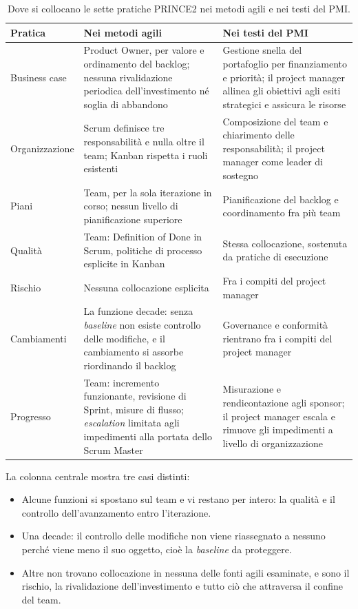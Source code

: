 \begin{table}[!htb]
\centering
\small
\caption{Dove si collocano le sette pratiche PRINCE2 nei metodi agili e nei
testi del PMI.}
\label{tab:ridistribuzione}
\begin{tabularx}{\textwidth}{@{}>{\raggedright\arraybackslash}p{1.9cm}XX@{}}
\toprule
\textbf{Pratica} & \textbf{Nei metodi agili} & \textbf{Nei testi del PMI} \\
\midrule
Business case &
Product Owner, per valore e ordinamento del backlog; nessuna rivalidazione
periodica dell'investimento n\'e soglia di abbandono &
Gestione snella del portafoglio per finanziamento e priorit\`a; il project
manager allinea gli obiettivi agli esiti strategici e assicura le risorse \\
\addlinespace
Organizza\-zione &
Scrum definisce tre responsabilit\`a e nulla oltre il team; Kanban rispetta i
ruoli esistenti &
Composizione del team e chiarimento delle responsabilit\`a; il project manager
come leader di sostegno \\
\addlinespace
Piani &
Team, per la sola iterazione in corso; nessun livello di pianificazione
superiore &
Pianificazione del backlog e coordinamento fra pi\`u team \\
\addlinespace
Qualit\`a &
Team: Definition of Done in Scrum, politiche di processo esplicite in Kanban &
Stessa collocazione, sostenuta da pratiche di esecuzione \\
\addlinespace
Rischio &
Nessuna collocazione esplicita &
Fra i compiti del project manager \\
\addlinespace
Cambia\-menti &
La funzione decade: senza \emph{baseline} non esiste controllo delle modifiche,
e il cambiamento si assorbe riordinando il backlog &
Governance e conformit\`a rientrano fra i compiti del project manager \\
\addlinespace
Progresso &
Team: incremento funzionante, revisione di Sprint, misure di flusso;
\emph{escalation} limitata agli impedimenti alla portata dello Scrum Master &
Misurazione e rendicontazione agli sponsor; il project manager escala e rimuove
gli impedimenti a livello di organizzazione \\
\bottomrule
\end{tabularx}
\end{table}
\newpage

La colonna centrale mostra tre casi distinti:
\begin{itemize}
  \item Alcune funzioni si spostano sul team e vi restano per intero: la qualit\`a e il
controllo dell'avanzamento entro l'iterazione.
 \item  Una decade: il controllo delle
modifiche non viene riassegnato a nessuno perch\'e viene meno il suo oggetto,
cio\`e la \emph{baseline} da proteggere.
 \item Altre non trovano collocazione in
nessuna delle fonti agili esaminate, e sono il rischio, la rivalidazione
dell'investimento e tutto ci\`o che attraversa il confine del team.
\end{itemize}

